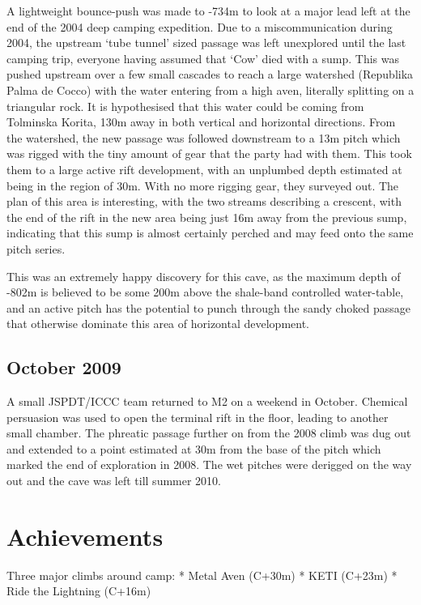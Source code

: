 A lightweight bounce-push was made to -734m to look at a major lead left
at the end of the 2004 deep camping expedition. Due to a
miscommunication during 2004, the upstream `tube tunnel' sized passage
was left unexplored until the last camping trip, everyone having assumed
that `Cow' died with a sump. This was pushed upstream over a few small
cascades to reach a large watershed (Republika Palma de Cocco) with the
water entering from a high aven, literally splitting on a triangular
rock. It is hypothesised that this water could be coming from Tolminska
Korita, 130m away in both vertical and horizontal directions. From the
watershed, the new passage was followed downstream to a 13m pitch which
was rigged with the tiny amount of gear that the party had with them.
This took them to a large active rift development, with an unplumbed
depth estimated at being in the region of 30m. With no more rigging
gear, they surveyed out. The plan of this area is interesting, with the
two streams describing a crescent, with the end of the rift in the new
area being just 16m away from the previous sump, indicating that this
sump is almost certainly perched and may feed onto the same pitch
series.

This was an extremely happy discovery for this cave, as the maximum
depth of -802m is believed to be some 200m above the shale-band
controlled water-table, and an active pitch has the potential to punch
through the sandy choked passage that otherwise dominate this area of
horizontal development.

\hypertarget{october-2009}{%
\subsection{October 2009}\label{october-2009}}

A small JSPDT/ICCC team returned to M2 on a weekend in October. Chemical
persuasion was used to open the terminal rift in the floor, leading to
another small chamber. The phreatic passage further on from the 2008
climb was dug out and extended to a point estimated at 30m from the base
of the pitch which marked the end of exploration in 2008. The wet
pitches were derigged on the way out and the cave was left till summer
2010.

\hypertarget{achievements}{%
\section{Achievements}\label{achievements}}

Three major climbs around camp: * Metal Aven (C+30m) * KETI (C+23m) *
Ride the Lightning (C+16m)

